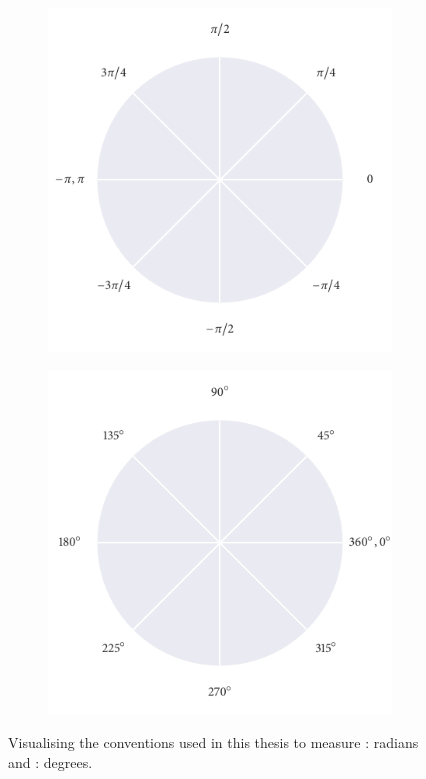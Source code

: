\begin{figure}[tb]
\centering
    \begin{subfigure}[b]{0.5\textwidth}
		\includegraphics{radian_axes.pdf}
		\caption{}
		\label{subfig:radian_axes}
	\end{subfigure}%
	\begin{subfigure}[b]{0.5\textwidth}
		\centering
		\includegraphics{degree_axes.pdf}
		\caption{}
		\label{subfig:degree_axes}
	\end{subfigure}
    \caption{Visualising the conventions used in this thesis to measure
      : radians and :
      degrees.}
	\label{fig:compare_axes}
\end{figure}

